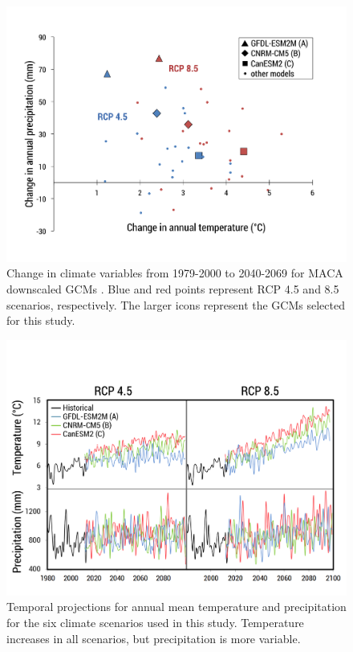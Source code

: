 \documentclass[water,article,submit,moreauthors,pdftex,10pt,a4paper]{mdpi}
\theoremstyle{mdpi}
\newcounter{ex}
\newcounter{re}
\theoremstyle{mdpidefinition}
\begin{document}
\begin{figure}
\centering
\includegraphics[width=\textwidth]{figure-files/figure4.png}
\caption{Change in climate variables from 1979-2000 to 2040-2069 for MACA downscaled GCMs \citep{Abatzoglou:2011kca}. Blue and red points represent RCP 4.5 and 8.5 scenarios, respectively. The larger icons represent the GCMs selected for this study.}
\label{fig:ClimateChange}
\end{figure}
\clearpage

\begin{figure}
\centering
\includegraphics[width=\textwidth]{figure-files/figure5.png}
\caption{Temporal projections for annual mean temperature and precipitation for the six climate scenarios used in this study. Temperature increases in all scenarios, but precipitation is more variable.}
\label{fig:ClimateChangeSelected}
\end{figure}
\clearpage
\end{document}
